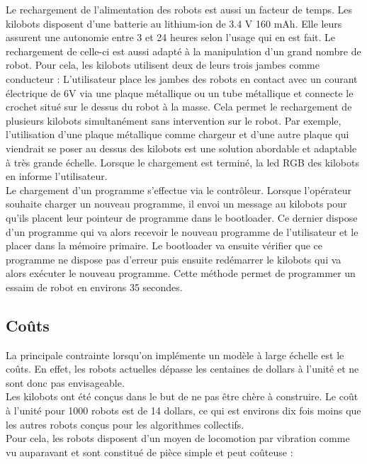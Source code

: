 \documentclass[a4paper,8pt]{report}
\begin{document}
\medskip
Le rechargement de l'alimentation des robots est aussi un facteur de temps. Les kilobots disposent d'une batterie au lithium-ion de 3.4 V 160 mAh. Elle leurs assurent une autonomie entre 3 et 24 heures selon l'usage qui en est fait. Le rechargement de celle-ci est aussi adapt\'e \`a la manipulation d'un grand nombre de robot. Pour cela, les kilobots utilisent deux de leurs trois jambes comme conducteur : L'utilisateur place les jambes des robots en contact avec un courant \'electrique de 6V via une plaque m\'etallique ou un tube m\'etallique et connecte le crochet situ\'e sur le dessus du robot \`a la masse. Cela permet le rechargement de plusieurs kilobots simultan\'ement sans intervention sur le robot. Par exemple, l'utilisation d'une plaque m\'etallique comme chargeur et d'une autre plaque qui viendrait se poser au dessus des kilobots est une solution abordable et adaptable \`a tr\`es grande \'echelle. Lorsque le chargement est termin\'e, la led RGB des kilobots en informe l'utilisateur.\\

\medskip
Le chargement d'un programme s'effectue via le contr\^oleur. Lorsque l'op\'erateur souhaite charger un nouveau programme, il envoi un message au kilobots pour qu'ils placent leur pointeur de programme dans le bootloader. Ce dernier dispose d'un programme qui va alors recevoir le nouveau programme de l'utilisateur et le placer dans la m\'emoire primaire. Le bootloader va ensuite v\'erifier que ce programme ne dispose pas d'erreur puis ensuite red\'emarrer le kilobots qui va alors ex\'ecuter le nouveau programme. Cette m\'ethode permet de programmer un essaim de robot en environs 35 secondes. \\

\subsection*{Co\^uts}\label{subsec:name}

La principale contrainte lorsqu'on impl\'emente un mod\`ele \`a large \'echelle est le co\^uts. En effet, les robots actuelles d\'epasse les centaines de dollars \`a l'unit\'e et ne sont donc pas envisageable. \\
Les kilobots ont \'et\'e con\c cus dans le but de ne pas \^etre ch\`ere \`a construire. Le co\^ut \`a l'unit\'e pour 1000 robots est de 14 dollars, ce qui est environs dix fois moins que les autres robots con\c cus pour les algorithmes collectifs. \\
Pour cela, les robots disposent d'un moyen de locomotion par vibration comme vu auparavant et sont constitu\'e de pi\`ece simple et peut co\^uteuse : \\
\end{document}
